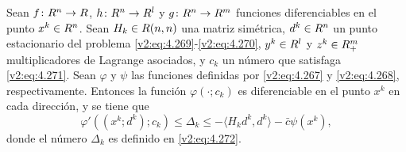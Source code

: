\begin{lemma}\label{v2:lem:4.6.1}
    Sean $f \colon R^n \to R$, $h \colon R^n \to R^l$ y $g \colon R^n \to R^m$ funciones diferenciables en el punto $x^k \in R^n$. Sean $H_k \in R(n, n)$ una matriz simétrica, $d^k \in R^n$ un punto estacionario del problema \eqref{v2:eq:4.269}-\eqref{v2:eq:4.270}, $y^k \in R^l$ y $z^k \in R^m_+$ multiplicadores de Lagrange asociados, y $c_k$ un número que satisfaga \eqref{v2:eq:4.271}. Sean $\varphi$ y $\psi$ las funciones definidas por \eqref{v2:eq:4.267} y \eqref{v2:eq:4.268}, respectivamente.
    Entonces la función $\varphi(\cdot; c_k)$ es diferenciable en el punto $x^k$ en cada dirección, y se tiene que
    \begin{equation}
        \varphi'((x^k; d^k); c_k) \le \Delta_k \le -\langle H_k d^k, d^k \rangle - \bar{c}\psi(x^k),
        \label{v2:eq:4.274}
    \end{equation}
    donde el número $\Delta_k$ es definido en \eqref{v2:eq:4.272}.
\end{lemma}
